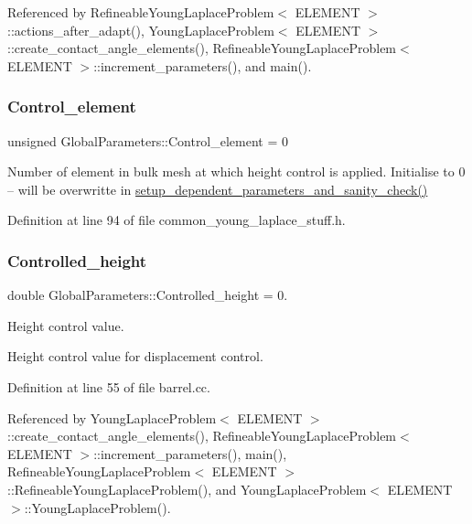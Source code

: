 Referenced by Refineable\+Young\+Laplace\+Problem$<$ E\+L\+E\+M\+E\+N\+T $>$\+::actions\+\_\+after\+\_\+adapt(), Young\+Laplace\+Problem$<$ E\+L\+E\+M\+E\+N\+T $>$\+::create\+\_\+contact\+\_\+angle\+\_\+elements(), Refineable\+Young\+Laplace\+Problem$<$ E\+L\+E\+M\+E\+N\+T $>$\+::increment\+\_\+parameters(), and main().

\mbox{\label{namespaceGlobalParameters_a3a90a762edbce6d2a95456df26e85cea}} 
\subsubsection{\texorpdfstring{Control\+\_\+element}{Control\_element}}
{\footnotesize\ttfamily unsigned Global\+Parameters\+::\+Control\+\_\+element = 0}

Number of element in bulk mesh at which height control is applied. Initialise to 0 -- will be overwritte in \hyperlink{namespaceGlobalParameters_aedbc21f2c81d445634badfc5cdd77436}{setup\+\_\+dependent\+\_\+parameters\+\_\+and\+\_\+sanity\+\_\+check()} 

Definition at line 94 of file common\+\_\+young\+\_\+laplace\+\_\+stuff.\+h.

\mbox{\label{namespaceGlobalParameters_a3731f24a02ce4f306d65a9a488f85c96}} 
\subsubsection{\texorpdfstring{Controlled\+\_\+height}{Controlled\_height}}
{\footnotesize\ttfamily double Global\+Parameters\+::\+Controlled\+\_\+height = 0.}



Height control value. 

Height control value for displacement control. 

Definition at line 55 of file barrel.\+cc.



Referenced by Young\+Laplace\+Problem$<$ E\+L\+E\+M\+E\+N\+T $>$\+::create\+\_\+contact\+\_\+angle\+\_\+elements(), Refineable\+Young\+Laplace\+Problem$<$ E\+L\+E\+M\+E\+N\+T $>$\+::increment\+\_\+parameters(), main(), Refineable\+Young\+Laplace\+Problem$<$ E\+L\+E\+M\+E\+N\+T $>$\+::\+Refineable\+Young\+Laplace\+Problem(), and Young\+Laplace\+Problem$<$ E\+L\+E\+M\+E\+N\+T $>$\+::\+Young\+Laplace\+Problem().


